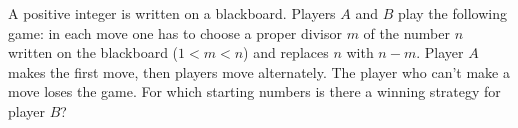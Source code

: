 A positive integer is written on a blackboard. Players $A$ and $B$ play the following game: in each move one has to choose a proper divisor $m$ of the number $n$ written on the blackboard ($1<m<n$) and replaces $n$ with $n-m$. Player $A$ makes the first move, then players move alternately. The player who can't make a move loses the game. For which starting numbers is there a winning strategy for player $B$?